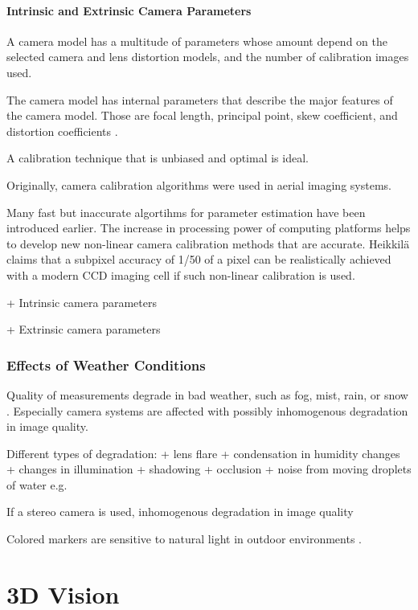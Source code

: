 \documentclass[12pt,a4paper,oneside,pdftex]{report}
\begin{document}
\subsubsection{Intrinsic and Extrinsic Camera Parameters}

A camera model has a multitude of parameters whose amount depend on the selected camera and lens distortion models, and the number of calibration images used. 

The camera model has internal parameters that describe the major features of the camera model. Those are focal length, principal point, skew coefficient, and distortion coefficients \cite{CaltechWeb10}.



A calibration technique that is unbiased and optimal is ideal. 

Originally, camera calibration algorithms were used in aerial imaging systems.


Many fast but inaccurate algortihms for parameter estimation have been introduced earlier. The increase in processing power of computing platforms helps to develop new non-linear camera calibration methods that are accurate. Heikkilä \cite{Heikkila00} claims that a subpixel accuracy of 1/50 of a pixel can be realistically achieved with a modern CCD imaging cell if such non-linear calibration is used.

+ Intrinsic camera parameters

+ Extrinsic camera parameters
\subsection{Effects of Weather Conditions}

Quality of measurements degrade in bad weather, such as fog, mist, rain, or snow \cite{Kawai12}. 
Especially camera systems are affected with possibly inhomogenous degradation in image quality.

Different types of degradation:
    + lens flare
    + condensation in humidity changes
    + changes in illumination
    + shadowing
    + occlusion
    + noise from moving droplets of water e.g.

If a stereo camera is used, inhomogenous degradation in image quality


Colored markers are sensitive to natural light in outdoor environments \cite{Kawai12}.

\chapter{3D Vision}
\end{document}
